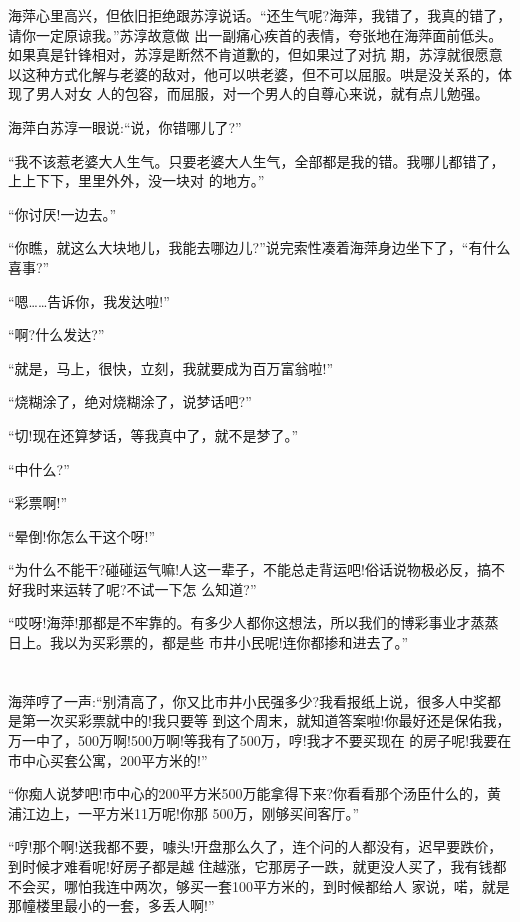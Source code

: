 \documentclass[11pt,a4paper,onecolumn]{article}
\begin{document}
海萍心里高兴，但依旧拒绝跟苏淳说话。``还生气呢?海萍，我错了，我真的错了，请你一定原谅我。''苏淳故意做
出一副痛心疾首的表情，夸张地在海萍面前低头。如果真是针锋相对，苏淳是断然不肯道歉的，但如果过了对抗
期，苏淳就很愿意以这种方式化解与老婆的敌对，他可以哄老婆，但不可以屈服。哄是没关系的，体现了男人对女
人的包容，而屈服，对一个男人的自尊心来说，就有点儿勉强。

海萍白苏淳一眼说:``说，你错哪儿了?''

``我不该惹老婆大人生气。只要老婆大人生气，全部都是我的错。我哪儿都错了，上上下下，里里外外，没一块对
的地方。''

``你讨厌!一边去。''

``你瞧，就这么大块地儿，我能去哪边儿?''说完索性凑着海萍身边坐下了，``有什么喜事?''

``嗯……告诉你，我发达啦!''

``啊?什么发达?''

``就是，马上，很快，立刻，我就要成为百万富翁啦!''

``烧糊涂了，绝对烧糊涂了，说梦话吧?''

``切!现在还算梦话，等我真中了，就不是梦了。''

``中什么?''

``彩票啊!''

``晕倒!你怎么干这个呀!''

``为什么不能干?碰碰运气嘛!人这一辈子，不能总走背运吧!俗话说物极必反，搞不好我时来运转了呢?不试一下怎
么知道?''

``哎呀!海萍!那都是不牢靠的。有多少人都你这想法，所以我们的博彩事业才蒸蒸日上。我以为买彩票的，都是些
市井小民呢!连你都掺和进去了。''

\section[\thesection]{}

海萍哼了一声:``别清高了，你又比市井小民强多少?我看报纸上说，很多人中奖都是第一次买彩票就中的!我只要等
到这个周末，就知道答案啦!你最好还是保佑我，万一中了，500万啊!500万啊!等我有了500万，哼!我才不要买现在
的房子呢!我要在市中心买套公寓，200平方米的!''

``你痴人说梦吧!市中心的200平方米500万能拿得下来?你看看那个汤臣什么的，黄浦江边上，一平方米11万呢!你那
500万，刚够买间客厅。''

``哼!那个啊!送我都不要，噱头!开盘那么久了，连个问的人都没有，迟早要跌价，到时候才难看呢!好房子都是越
住越涨，它那房子一跌，就更没人买了，我有钱都不会买，哪怕我连中两次，够买一套100平方米的，到时候都给人
家说，喏，就是那幢楼里最小的一套，多丢人啊!''
\end{document}
